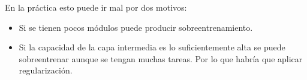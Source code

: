 En la práctica esto puede ir mal por dos motivos:
\begin{itemize}
    \item Si se tienen pocos módulos puede producir sobreentrenamiento.
    \item Si la capacidad de la capa intermedia es lo suficientemente alta se puede
        sobreentrenar aunque se tengan muchas tareas. Por lo que habría que aplicar
        regularización.
\end{itemize}
